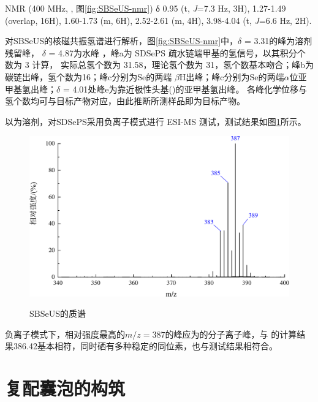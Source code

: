 \documentclass[bachelor,winfonts,replaceperiod]{jnuthesis}
\begin{document}
     NMR (400 MHz, , 图\ref{fig:SBSeUS-nmr}) δ 0.95 (t, \textit{J}=7.3 Hz, 3H), 1.27-1.49 (overlap, 16H), 
    1.60-1.73 (m, 6H), 2.52-2.61 (m, 4H), 3.98-4.04 (t, \textit{J}=6.6 Hz, 2H).
    
    对SBSeUS的核磁共振氢谱进行解析，图\ref{fig:SBSeUS-nmr}中，$\delta$ = 3.31的峰为溶剂残留峰，
    $\delta$ = 4.87为水峰\cite{波谱解析} ，峰a为 SDSePS 疏水链端甲基的氢信号，以其积分个数为 3 计算，
    实际总氢个数为 31.58，理论氢个数为 31，氢个数基本吻合；峰b为碳链出峰，氢个数为16；峰c分别为Se的两端
    $\beta$H出峰；峰c分别为Se的两端$\alpha$位亚甲基氢出峰；$\delta$ = 4.01处峰e为靠近极性头基()的亚甲基氢出峰。
    各峰化学位移与氢个数均可与目标产物对应，由此推断所测样品即为目标产物。
    
    以为溶剂，对SDSePS采用负离子模式进行 ESI-MS 测试，测试结果如图\ref{fig:SBSeUS-mass}所示。
    \begin{figure}[htbp]
        \centering
        \includegraphics[width=.8\textwidth]{figure/SBSeUS-mass.pdf}\\
        \caption{SBSeUS的质谱}\label{fig:SBSeUS-mass}
    \end{figure}
    
    负离子模式下，相对强度最高的$m/z = 387$的峰应为的分子离子峰，与
    的计算结果386.42基本相符，同时硒有多种稳定的同位素，也与测试结果相符合。

    \section{复配囊泡的构筑}
\end{document}
